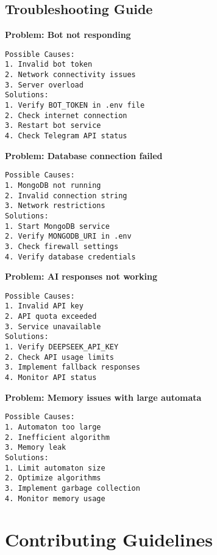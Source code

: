 \documentclass[12pt]{article}
\begin{document}
\subsection{Troubleshooting Guide}
\textbf{Problem: Bot not responding}
\begin{lstlisting}
Possible Causes:
1. Invalid bot token
2. Network connectivity issues
3. Server overload
Solutions:
1. Verify BOT_TOKEN in .env file
2. Check internet connection
3. Restart bot service
4. Check Telegram API status
\end{lstlisting}
\textbf{Problem: Database connection failed}
\begin{lstlisting}
Possible Causes:
1. MongoDB not running
2. Invalid connection string
3. Network restrictions
Solutions:
1. Start MongoDB service
2. Verify MONGODB_URI in .env
3. Check firewall settings
4. Verify database credentials
\end{lstlisting}
\textbf{Problem: AI responses not working}
\begin{lstlisting}
Possible Causes:
1. Invalid API key
2. API quota exceeded
3. Service unavailable
Solutions:
1. Verify DEEPSEEK_API_KEY
2. Check API usage limits
3. Implement fallback responses
4. Monitor API status
\end{lstlisting}
\textbf{Problem: Memory issues with large automata}
\begin{lstlisting}
Possible Causes:
1. Automaton too large
2. Inefficient algorithm
3. Memory leak
Solutions:
1. Limit automaton size
2. Optimize algorithms
3. Implement garbage collection
4. Monitor memory usage
\end{lstlisting}

\section{Contributing Guidelines}
\end{document}
